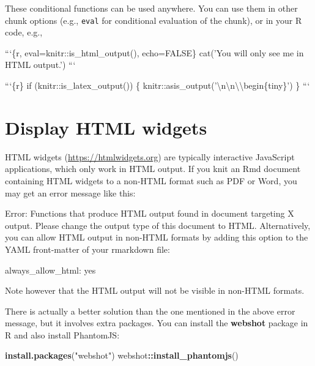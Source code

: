 \documentclass[
  11pt,
]{krantz}
\newenvironment{Shaded}{\begin{snugshade}}{\end{snugshade}}
\newcommand{\BaseNTok}[1]{\textcolor[rgb]{0.06,0.06,0.06}{#1}}
\newcommand{\KeywordTok}[1]{\textcolor[rgb]{0.27,0.27,0.27}{\textbf{#1}}}
\newcommand{\NormalTok}[1]{#1}
\newcommand{\OperatorTok}[1]{\textcolor[rgb]{0.43,0.43,0.43}{\textbf{#1}}}
\newcommand{\StringTok}[1]{\textcolor[rgb]{0.5,0.5,0.5}{#1}}
\begin{document}
These conditional functions can be used anywhere. You can use them in other chunk options (e.g., \texttt{eval} for conditional evaluation of the chunk), or in your R code, e.g.,

\begin{Shaded}
\begin{Highlighting}[]
\BaseNTok{```\{r, eval=knitr::is_html_output(), echo=FALSE\}}
\BaseNTok{cat('You will only see me in HTML output.')}
\BaseNTok{```}

\BaseNTok{```\{r\}}
\BaseNTok{if (knitr::is_latex_output()) \{}
\BaseNTok{  knitr::asis_output('\textbackslash{}n\textbackslash{}n\textbackslash{}\textbackslash{}begin\{tiny\}')}
\BaseNTok{\}}
\BaseNTok{```}
\end{Highlighting}
\end{Shaded}

\hypertarget{html-widgets}{%
\section{Display HTML widgets}\label{html-widgets}}

HTML widgets (\url{https://htmlwidgets.org}) are typically interactive JavaScript applications, which only work in HTML output. If you knit an Rmd document containing HTML widgets to a non-HTML format such as PDF or Word, you may get an error message like this:

\begin{Shaded}
\begin{Highlighting}[]
\NormalTok{Error: Functions that produce HTML output found in document}
\NormalTok{targeting X output. Please change the output type of this}
\NormalTok{document to HTML. Alternatively, you can allow HTML output in}
\NormalTok{non-HTML formats by adding this option to the YAML front-matter}
\NormalTok{of your rmarkdown file:}

\NormalTok{  always_allow_html: yes}

\NormalTok{Note however that the HTML output will not be visible in}
\NormalTok{non-HTML formats.}
\end{Highlighting}
\end{Shaded}

There is actually a better solution than the one mentioned in the above error message, but it involves extra packages. You can install the \textbf{webshot} package in R and also install PhantomJS:

\begin{Shaded}
\begin{Highlighting}[]
\KeywordTok{install.packages}\NormalTok{(}\StringTok{"webshot"}\NormalTok{)}
\NormalTok{webshot}\OperatorTok{::}\KeywordTok{install_phantomjs}\NormalTok{()}
\end{Highlighting}
\end{Shaded}
\end{document}
